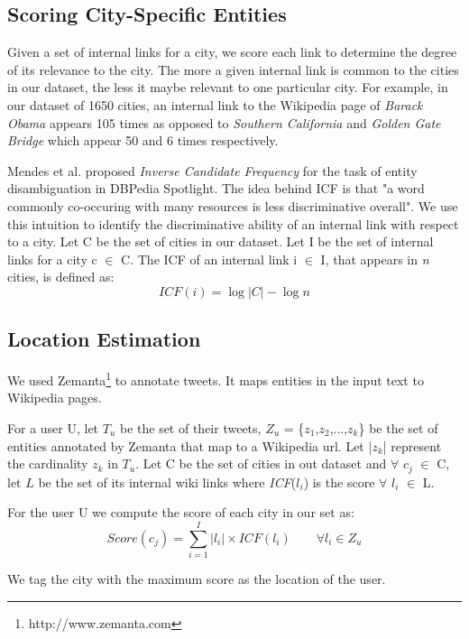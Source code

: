 \subsection{Scoring City-Specific Entities}
Given a set of internal links for a city, we score each link to determine the degree of its relevance to the city. The more a given internal link is common to the cities in our dataset, the less it maybe relevant to one particular city. For example, in our dataset of 1650 cities, an internal link to the Wikipedia page of \textit{Barack Obama} appears 105 times as opposed to \textit{Southern California} and \textit{Golden Gate Bridge} which appear 50 and 6 times respectively. 

Mendes et al. \cite{mendes2011dbpedia} proposed \textit{Inverse Candidate Frequency} for the task of entity disambiguation in DBPedia Spotlight. The idea behind ICF is that "a word commonly co-occuring with many resources is less discriminative overall". We use this intuition to identify the discriminative ability of an internal link with respect to a city. Let C be the set of cities in our dataset. Let I be the set of internal links for a city c $\in$ C. The ICF of an internal link i $\in$ I, that appears in \textit{n} cities, is defined as:
\begin{equation}
	ICF(i) = \log |C|- \log n
\end{equation}

\subsection{Location Estimation}
We used Zemanta\footnote{http://www.zemanta.com} to annotate tweets. It maps entities in the input text to Wikipedia pages.

For a user U, let $T_{u}$ be the set of their tweets, $Z_{u}$ = \{$z_{1}$,$z_{2}$,...,$z_{k}$\} be the set of entities annotated by Zemanta that map to a Wikipedia url. Let |$z_{k}$| represent the cardinality $z_{k}$ in $T_{u}$. Let C be the set of cities in out dataset and $\forall$ $c_{j}$ $\in$ C, let $L$ be the set of its internal wiki links where \textit{ICF}($l_{i}$) is the score $\forall$ $l_{i}$ $\in$ L.

For the user U we compute the score of each city in our set as:
\begin{equation}
	Score(c_{j}) = \sum_{i=1}^I |l_{i}| \times ICF(l_{i})\qquad  \forall l_{i} \in Z_{u}
\end{equation}

We tag the city with the maximum score as the location of the user.






